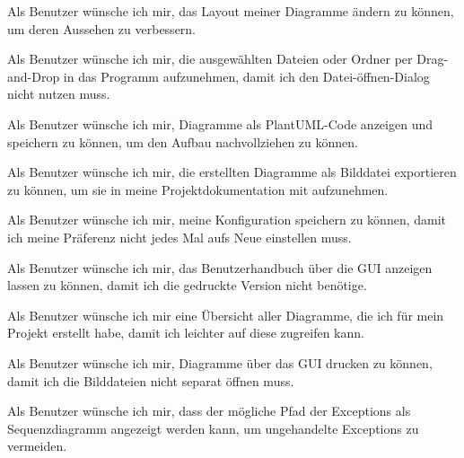 Als Benutzer wünsche ich mir, das Layout meiner Diagramme ändern zu können, um deren Aussehen zu verbessern.
\nsecend


Als Benutzer wünsche ich mir, die ausgewählten Dateien oder Ordner per Drag-and-Drop in das Programm aufzunehmen, damit ich den Datei-öffnen-Dialog nicht nutzen muss.
\nsecend

Als Benutzer wünsche ich mir, Diagramme als PlantUML-Code anzeigen und speichern zu können, um den Aufbau nachvollziehen zu können.
\nsecend

Als Benutzer wünsche ich mir, die erstellten Diagramme als Bilddatei exportieren zu können, um sie in meine Projektdokumentation mit aufzunehmen.
\nsecend

Als Benutzer wünsche ich mir, meine Konfiguration speichern zu können, damit ich meine Präferenz nicht jedes Mal aufs Neue einstellen muss.
\nsecend

Als Benutzer wünsche ich mir, das Benutzerhandbuch über die GUI anzeigen lassen zu können, damit ich die gedruckte Version nicht benötige.
\nsecend

Als Benutzer wünsche ich mir eine Übersicht aller Diagramme, die ich für mein Projekt erstellt habe, damit ich leichter auf diese zugreifen kann.
\nsecend

Als Benutzer wünsche ich mir, Diagramme über das GUI drucken zu können, damit ich die Bilddateien nicht separat öffnen muss.
\nsecend

Als Benutzer wünsche ich mir, dass der mögliche Pfad der Exceptions als Sequenzdiagramm angezeigt werden kann, um ungehandelte Exceptions zu vermeiden.
\nsecend

\nsecend